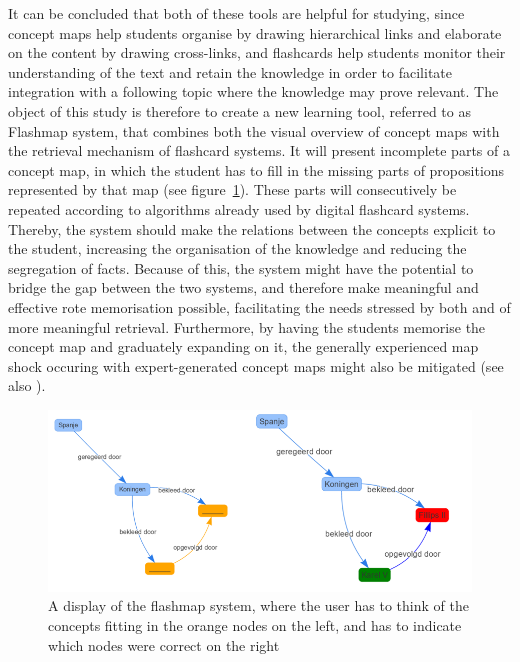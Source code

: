 It can be concluded that both of these tools are helpful for studying, since concept maps help students organise by drawing hierarchical links and elaborate on the content by drawing cross-links, and flashcards help students monitor their understanding of the text and retain the knowledge in order to facilitate integration with a following topic where the knowledge may prove relevant. The object of this study is therefore to create a new learning tool, referred to as Flashmap system, that combines both the visual overview of concept maps with the retrieval mechanism of flashcard systems. It will present incomplete parts of a concept map, in which the student has to fill in the missing parts of propositions represented by that map (see figure~\ref{fig:flashmap}). These parts will consecutively be repeated according to algorithms already used by digital flashcard systems. Thereby, the system should make the relations between the concepts explicit to the student, increasing the organisation of the knowledge and reducing the segregation of facts. Because of this, the system might have the potential to bridge the gap between the two systems, and therefore make meaningful and effective rote memorisation possible, facilitating the needs stressed by both  and  of more meaningful retrieval. Furthermore, by having the students memorise the concept map and graduately expanding on it, the generally experienced map shock occuring with expert-generated concept maps might also be mitigated (see also ).

\begin{figure}
    \centering
    \includegraphics[width=\textwidth]{img/flashmap}
    \caption{A display of the flashmap system, where the user has to think of the concepts fitting in the orange nodes on the left, and has to indicate which nodes were correct on the right}
    \label{fig:flashmap}
\end{figure}

